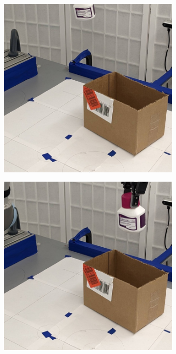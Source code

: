 \documentclass{article}
\begin{document}
\begin{figure}[]
\begin{subfigure}{(\linewidth - 0.05\linewidth)/5}
    \end{subfigure}
    \begin{subfigure}{(\linewidth - 0.05\linewidth)/5}
        \centering
        \includegraphics[width=\linewidth]{figures/episodes/bottle_in_box/6.jpg}
    \end{subfigure}
    \begin{subfigure}{(\linewidth - 0.05\linewidth)/5}
        \centering
        \includegraphics[width=\linewidth]{figures/episodes/bottle_in_box/5.jpg}

\end{subfigure}
\end{figure}
\end{document}
